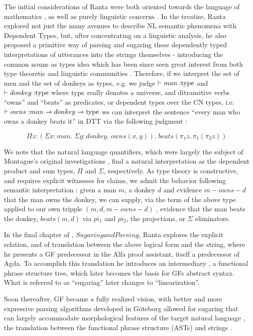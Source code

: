The initial considerations of Ranta were both oriented towards the language of
mathematics \cite{ranta93}, as well as purely linguistic concerns
\cite{ranta1994type}. In the treatise, Ranta explored not just the many avenues
to describe NL semantic phenomena with Dependent Types, but, after concentrating
on a linguistic analysis, he also proposed a primitive way of parsing and
sugaring these dependently typed interpretations of utterances into the strings
themselves - introducing the common nouns as types idea which has been since
seen great interest from both type theoretic and linguistic communities
\cite{luoCNs}. Therefore, if we interpret the set of men and the set of donkeys
as types, e.g. we judge $\vdash man \; {:} {\rm type}$ and $\vdash donkey \; {:}
{\rm type}$ where ${\rm type}$ really denotes a universe, and ditransitive verbs
``owns'' and ``beats'' as predicates, or dependent types over the CN types, i.e.
$\vdash owns \; {:} man \rightarrow donkey \rightarrow {\rm type}$ we can
interpret the sentence ``every man who owns a donkey beats it'' in DTT via the
following judgment :

\[\Pi z : (\Sigma x : man. \; \Sigma y : donkey. \; owns(x,y)). \; beats(\pi_1z,\pi_1(\pi_2z))\]

We note that the natural language quantifiers, which were largely the subject of
Montague's original investigations \cite{Montague1973}, find a natural
interpretation as the dependent product and sum types, $\Pi$ and $\Sigma$,
respectively. As type theory is constructive, and requires explicit witnesses
for claims, we admit the behavior following semantic interpretation : given a
man $m$, a donkey $d$ and evidence $m-owns-d$ that the man owns the donkey, we
can supply, via the term of the above type applied to our own tripple
$(m,d,m-owns-d)$ , evidence that the man beats the donkey, $beats(m,d)$ via
$pi_1$ and $pi_2$, the projections, or $\Sigma$ eliminators.

In the final chapter of \cite{ranta1994type}, $Sugaring and Parsing$, Ranta
explores the explicit relation, and of translation between the above logical
form and the string, where he presents a GF predecessor in the Alfa proof
assistant, itself a predecessor of Agda. To accomplish this translation he
introduces an intermediary , a functional phrase structure tree, which later
becomes the basis for GFs abstract syntax.  What is referred to as ``sugaring''
later changes to ``linearization''.

Soon thereafter, GF became a fully realized vision, with better and more
expressive parsing algorithms \cite{ljunglof2004expressivity} developed in
Göteborg allowed for sugaring that can largely accommodate morphological
features of the target natural language \cite{rantaForsberg}, the translation
between the functional phrase structure (ASTs) and strings \cite{ranta_2004}.

